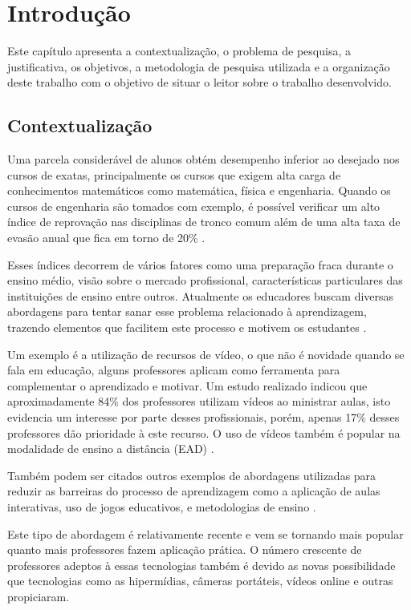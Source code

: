 \chapter[Introdução]{Introdução}

Este capítulo apresenta a contextualização, o problema de pesquisa, a justificativa, os objetivos, a metodologia de pesquisa utilizada e a organização deste trabalho com o objetivo de situar o leitor sobre o trabalho desenvolvido.

\section{Contextualização}

Uma parcela considerável de alunos obtém desempenho inferior ao desejado nos cursos de exatas, principalmente os cursos que exigem alta carga de conhecimentos matemáticos como matemática, física e engenharia. Quando os cursos de engenharia são tomados com exemplo, é possível verificar um alto índice de reprovação nas disciplinas de tronco comum além de uma alta taxa de evasão anual que fica em torno de 20\% \cite{fragelli2012summae}.

Esses índices decorrem de vários fatores como uma preparação fraca durante o ensino médio, visão sobre o mercado profissional, características particulares das instituições de ensino entre outros. Atualmente os educadores buscam diversas abordagens para tentar sanar esse problema relacionado à aprendizagem, trazendo elementos que facilitem este processo e motivem os estudantes \cite{fragelliplaycalculo}. 

Um exemplo é a utilização de recursos de vídeo, o que não é novidade quando se fala em educação, alguns professores aplicam como ferramenta para complementar o aprendizado e motivar. Um estudo realizado indicou que aproximadamente 84\% dos professores utilizam vídeos ao ministrar aulas, isto evidencia um interesse por parte desses profissionais, porém, apenas 17\% desses professores dão prioridade à este recurso. O uso de vídeos também é popular na modalidade de ensino a distância (EAD) \cite{vicentini2008uso}. 

Também podem ser citados outros exemplos de abordagens utilizadas para reduzir as barreiras do processo de aprendizagem como a aplicação de aulas interativas, uso de jogos educativos, e metodologias de ensino \cite{fragelli2012osama, fragelli2011batalha, fragelliplaycalculo}.

Este tipo de abordagem é relativamente recente e vem se tornando mais popular quanto mais professores fazem aplicação prática. O número crescente de professores adeptos à essas tecnologias também é devido as novas possibilidade que tecnologias como as hipermídias, câmeras portáteis, vídeos online e outras propiciaram.


